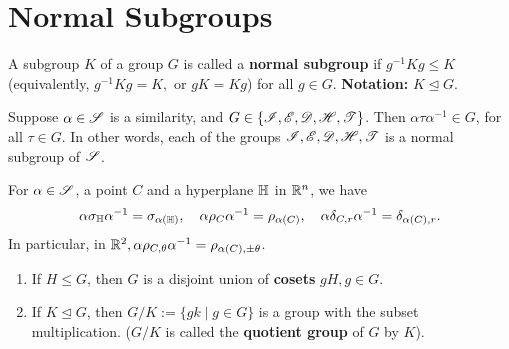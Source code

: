 \section{Normal Subgroups}
\begin{definition}
    A subgroup \(K\) of a group \(G\) is called a \textbf{normal subgroup} if \(g^{-1}Kg \leq K\) (equivalently, \(g^{-1}Kg = K, \) or \(gK = Kg\)) for all \(g \in G\). \textbf{Notation: } \(K \trianglelefteq G\).
\end{definition}

\begin{theorem}
    Suppose \(\alpha \in \mathscr{S}\) is a similarity, and \(G \in \{\mathscr{I}, \mathscr{E}, \mathscr{D}, \mathscr{H}, \mathscr{T}\}\). Then \(\alpha \tau \alpha^{-1} \in G\), for all \(\tau \in G\). In other words, each of the groups \(\mathscr{I}, \mathscr{E}, \mathscr{D},\mathscr{H},\mathscr{T}\) is a normal subgroup of \(\mathscr{S}\).
\end{theorem}

\begin{corollary}
    For \(\alpha \in \mathscr{S}\), a point \(C\) and a hyperplane \(\mathbb{H}\) in \(\mathbb{R}^n\), we have
    \[\alpha\sigma_{\mathbb{H}}\alpha^{-1} = \sigma_{\alpha(\mathbb{H})}, \quad \alpha\rho_C\alpha^{-1} = \rho_{\alpha(C)}, \quad \alpha\delta_{C, r}\alpha^{-1} = \delta_{\alpha(C), r}.\]
    In particular, in \(\mathbb{R}^2, \alpha\rho_{C, \theta}\alpha^{-1} = \rho_{\alpha(C), \pm \theta}\).
\end{corollary}

\begin{proposition}
    \begin{enumerate}
        \item If \(H \leq G\), then \(G\) is a disjoint union of \textbf{cosets} \(gH, g \in G\).
        \item If \(K \trianglelefteq G\), then \(G / K := \{gk \mid g \in G \}\) is a group with the subset multiplication. (\(G / K\) is called the \textbf{quotient group} of \(G\) by \(K\)).
    \end{enumerate}
\end{proposition}